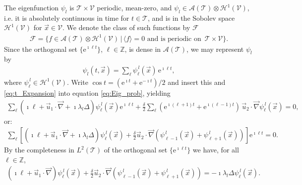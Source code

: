 \documentclass{article}
\newcommand{\e}{\mathrm{e}}
\newcommand{\Hc}{\mathcal{H}}
\newcommand{\Ac}{\mathcal{A}}
\newcommand{\Tc}{\mathcal{T}}
\newcommand{\Vc}{\mathcal{V}}
\newcommand{\Fc}{\mathcal{F}}
\newcommand{\0}{\mathbf{0}}
\newcommand{\1}{\mathbf{1}}
\newcommand{\2}{\mathbf{2}}
\newcommand{\3}{\mathbf{3}}
\newcommand{\4}{\mathbf{4}}
\newcommand{\5}{\mathbf{5}}
\newcommand{\6}{\mathbf{6}}
\newcommand{\7}{\mathbf{7}}
\newcommand{\8}{\mathbf{8}}
\begin{document}
The eigenfunction $\psi_l$ is $\Tc\times\Vc$ periodic, mean-zero, and
$\psi_l\in\Ac(\Tc)\otimes\Hc^1(\Vc)$, i.e. it is absolutely continuous in time
for $t\in\Tc$, and is in the Sobolev space $\Hc^1(\Vc)$ for
$\vec{x}\in\Vc$. We denote the class of such functions by $\Fc$
%
\begin{align}\label{eq:F}
  \Fc=\{f\in\Ac(\Tc)\otimes\Hc^1(\Vc)\,|\, \langle f\rangle=0  \text{ and is periodic on }
  \, \Tc\times\Vc\}. 
\end{align}
%
Since the orthogonal set $\{\e^{\imath\ell t}\}$,
${\ell\in\mathbb{Z}}$, is dense in $\Ac(\Tc)$, we may represent $\psi_l$ by 
%
\begin{align}\label{eq:t_Expansion}
  \psi_l(t,\vec{x})=\sum_\ell\psi_\ell^{\,l}(\vec{x})\,\e^{\imath \ell t},
\end{align}
%
where $\psi_\ell^{\,l}\in\Hc^1(\Vc)$. Write $\cos{t}=(\e^{\imath t}+\e^{-\imath t})/2$ and insert
this and \eqref{eq:t_Expansion} into equation \eqref{eq:Eig_prob},
yielding   
%
\begin{align}
  \sum_\ell(\imath \ell + \vec{u}_1\cdot\vec{\nabla}+\imath\lambda_l\Delta)\psi_\ell^{\,l}(\vec{x})\e^{\imath \ell t}
 +\frac{\delta}{2}\sum_\ell(\e^{\imath(\ell+1)t}+\e^{\imath(\ell-1)t})\,\vec{u}_2\cdot\vec{\nabla}\psi_\ell^{\,l}(\vec{x})=0,
\end{align}
%
or:
%
\begin{align}
  \sum_\ell\left[(\imath \ell + \vec{u}_1\cdot\vec{\nabla}+\imath\lambda_l\Delta)\psi_\ell^{\,l}(\vec{x})
 +\frac{\delta}{2}\vec{u}_2\cdot\vec{\nabla}(\psi^{\,l}_{\ell-1}(\vec{x})+\psi^{\,l}_{\ell+1}(\vec{x}))\right]\e^{\imath \ell t}=0.
\end{align}
%
By the completeness in $L^2(\Tc)$ of the orthogonal set $\{\e^{\imath \ell t}\}$ we
have, for all $\ell\in\mathbb{Z}$, 
%
\begin{align}\label{eq:Eig_prob_shift}
  (\imath \ell + \vec{u}_1\cdot\vec{\nabla})\psi_\ell^{\,l}(\vec{x})
 +\frac{\delta}{2}\vec{u}_2\cdot\vec{\nabla}(\psi_{\ell-1}^{\,l}(\vec{x})+\psi_{\ell+1}^{\,l}(\vec{x}))
 =-\imath\lambda_l\Delta\psi_\ell^{\,l}(\vec{x}).
\end{align}
%
\end{document}
